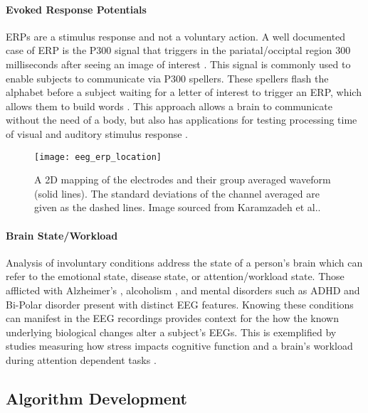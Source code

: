 \paragraph*{Evoked Response Potentials}
\acp{ERP} are a stimulus response and not a voluntary action. A well documented case of \ac{ERP} is the P300 signal that triggers in the pariatal/occiptal region 300 milliseconds after seeing an image of interest \cite{Picton1992}. This signal is commonly used to enable subjects to communicate via P300 spellers. These spellers flash the alphabet before a subject waiting for a letter of interest to trigger an \ac{ERP}, which allows them to build words \cite{Farwell1988}. This approach allows a brain to communicate without the need of a body, but also has applications for testing processing time of visual and auditory stimulus response \cite{Karamzadeh2013}.

\begin{figure}[h]
\centering
\texttt{[image: eeg\_erp\_location]}
\caption[Example of an ERP]{A 2D mapping of the electrodes and their group averaged waveform (solid lines). The standard deviations of the channel averaged are given as the dashed lines. Image sourced from Karamzadeh et al.\cite{Karamzadeh2013}.}
\label{fig:erpExample}
\end{figure}

\paragraph*{Brain State/Workload}
Analysis of involuntary conditions address the state of a person's brain which can refer to the emotional state, disease state, or attention/workload state. Those afflicted with Alzheimer's \cite{Jeong2004}, alcoholism \cite{Porjesz2005}, and mental disorders such as \ac{ADHD} and Bi-Polar disorder \cite{Basar2008} present with distinct \ac{EEG} features. Knowing these conditions can manifest in the \ac{EEG} recordings provides context for the how the known underlying biological changes alter a subject's \acp{EEG}. This is exemplified by studies measuring how stress impacts cognitive function \cite{Lupien2007} and a brain's workload during attention dependent tasks \cite{Schultze-Kraft2016}.

\subsection{Algorithm Development}

